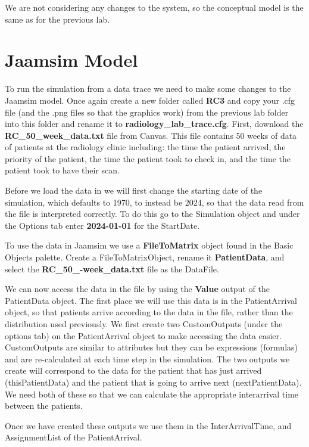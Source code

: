 \documentclass[
  10pt,
  a4paperpaper,
  DIV=11,
  numbers=noendperiod,
  oneside]{scrreprt}
\begin{document}
We are not considering any changes to the system, so the conceptual
model is the same as for the previous lab.

\section{Jaamsim Model}\label{jaamsim-model}

To run the simulation from a data trace we need to make some changes to
the Jaamsim model. Once again create a new folder called \textbf{RC3}
and copy your .cfg file (and the .png files so that the graphics work)
from the previous lab folder into this folder and rename it to
\textbf{radiology\_lab\_trace.cfg}. First, download the
\textbf{RC\_50\_week\_data.txt} file from Canvas. This file contains 50
weeks of data of patients at the radiology clinic including: the time
the patient arrived, the priority of the patient, the time the patient
took to check in, and the time the patient took to have their scan.

Before we load the data in we will first change the starting date of the
simulation, which defaults to 1970, to instead be 2024, so that the data
read from the file is interpreted correctly. To do this go to the
Simulation object and under the Options tab enter \textbf{2024-01-01}
for the StartDate.

To use the data in Jaamsim we use a \textbf{FileToMatrix} object found
in the Basic Objects palette. Create a FileToMatrixObject, rename it
\textbf{PatientData}, and select the \textbf{RC\_50\_-week\_data.txt}
file as the DataFile.

We can now access the data in the file by using the \textbf{Value}
output of the PatientData object. The first place we will use this data
is in the PatientArrival object, so that patients arrive according to
the data in the file, rather than the distribution used previously. We
first create two CustomOutputs (under the options tab) on the
PatientArrival object to make accessing the data easier. CustomOutputs
are similar to attributes but they can be expressions (formulas) and are
re-calculated at each time step in the simulation. The two outputs we
create will correspond to the data for the patient that has just arrived
(thisPatientData) and the patient that is going to arrive next
(nextPatientData). We need both of these so that we can calculate the
appropriate interarrival time between the patients.

Once we have created these outputs we use them in the InterArrivalTime,
and AssignmentList of the PatientArrival.
\end{document}
